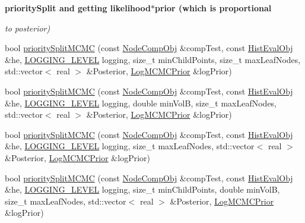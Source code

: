 \begin{Indent}{\bf priority\-Split and getting likelihood$\ast$prior (which is proportional}\par
{\em to posterior) }\begin{DoxyCompactItemize}
\item 
bool \hyperlink{classsubpavings_1_1AdaptiveHistogram_afa5a767156398a6d29db12fcbf0a46c7}{priority\-Split\-M\-C\-M\-C} (const \hyperlink{classsubpavings_1_1NodeCompObj}{\-Node\-Comp\-Obj} \&comp\-Test, const \hyperlink{classsubpavings_1_1HistEvalObj}{\-Hist\-Eval\-Obj} \&he, \hyperlink{namespacesubpavings_aef8e51096b59ecaf1a1e9b2ee24b6089}{\-L\-O\-G\-G\-I\-N\-G\-\_\-\-L\-E\-V\-E\-L} logging, size\-\_\-t min\-Child\-Points, size\-\_\-t max\-Leaf\-Nodes, std\-::vector$<$ real $>$ \&\-Posterior, \hyperlink{classsubpavings_1_1LogMCMCPrior}{\-Log\-M\-C\-M\-C\-Prior} \&log\-Prior)
\item 
bool \hyperlink{classsubpavings_1_1AdaptiveHistogram_a024499e93cb4ca592c78b860d09cef79}{priority\-Split\-M\-C\-M\-C} (const \hyperlink{classsubpavings_1_1NodeCompObj}{\-Node\-Comp\-Obj} \&comp\-Test, const \hyperlink{classsubpavings_1_1HistEvalObj}{\-Hist\-Eval\-Obj} \&he, \hyperlink{namespacesubpavings_aef8e51096b59ecaf1a1e9b2ee24b6089}{\-L\-O\-G\-G\-I\-N\-G\-\_\-\-L\-E\-V\-E\-L} logging, double min\-Vol\-B, size\-\_\-t max\-Leaf\-Nodes, std\-::vector$<$ real $>$ \&\-Posterior, \hyperlink{classsubpavings_1_1LogMCMCPrior}{\-Log\-M\-C\-M\-C\-Prior} \&log\-Prior)
\item 
bool \hyperlink{classsubpavings_1_1AdaptiveHistogram_a4c890ee5d86fc4cfd45c0ea2667b4a4f}{priority\-Split\-M\-C\-M\-C} (const \hyperlink{classsubpavings_1_1NodeCompObj}{\-Node\-Comp\-Obj} \&comp\-Test, const \hyperlink{classsubpavings_1_1HistEvalObj}{\-Hist\-Eval\-Obj} \&he, \hyperlink{namespacesubpavings_aef8e51096b59ecaf1a1e9b2ee24b6089}{\-L\-O\-G\-G\-I\-N\-G\-\_\-\-L\-E\-V\-E\-L} logging, size\-\_\-t max\-Leaf\-Nodes, std\-::vector$<$ real $>$ \&\-Posterior, \hyperlink{classsubpavings_1_1LogMCMCPrior}{\-Log\-M\-C\-M\-C\-Prior} \&log\-Prior)
\item 
bool \hyperlink{classsubpavings_1_1AdaptiveHistogram_ab4acf5596236ac6fa272cb3abe80bee8}{priority\-Split\-M\-C\-M\-C} (const \hyperlink{classsubpavings_1_1NodeCompObj}{\-Node\-Comp\-Obj} \&comp\-Test, const \hyperlink{classsubpavings_1_1HistEvalObj}{\-Hist\-Eval\-Obj} \&he, \hyperlink{namespacesubpavings_aef8e51096b59ecaf1a1e9b2ee24b6089}{\-L\-O\-G\-G\-I\-N\-G\-\_\-\-L\-E\-V\-E\-L} logging, size\-\_\-t min\-Child\-Points, double min\-Vol\-B, size\-\_\-t max\-Leaf\-Nodes, std\-::vector$<$ real $>$ \&\-Posterior, \hyperlink{classsubpavings_1_1LogMCMCPrior}{\-Log\-M\-C\-M\-C\-Prior} \&log\-Prior)

\end{DoxyCompactItemize}
\end{Indent}

